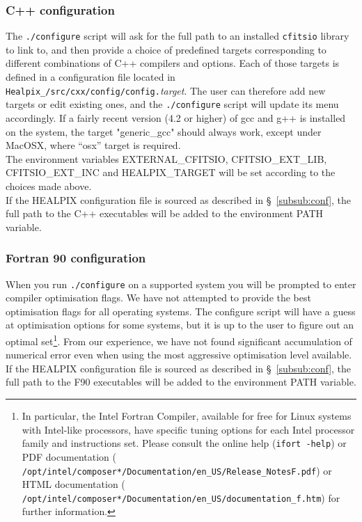 \documentclass[12pt,twoside]{article}
\begin{document}
\subsubsection{C++ configuration}
The {\tt ./configure} script will 
ask for the full path to an installed {\tt cfitsio} library to link to, and then provide a choice of
predefined targets corresponding to different combinations of C++ compilers and
options. Each of those targets is defined in a configuration file located in
{\tt Healpix\_\hpxversion/src/cxx/config/config.}{\em target}.
The user can therefore add new targets or edit existing ones, and the
{\tt ./configure} script will update its menu accordingly.
If a fairly recent version
(4.2 or higher) of gcc and g++ is installed on the system, the target
"generic\_gcc" should always work, except under MacOSX, where ``osx'' target is
required.  \\
The environment variables EXTERNAL\_CFITSIO, 
CFITSIO\_EXT\_LIB, 
CFITSIO\_EXT\_INC and 
HEALPIX\_TARGET 
will be set according to the choices made above.
\\
If the HEALPIX configuration file is sourced as described in \S~\ref{subsub:conf}, the full path to the C++
executables will be added to the environment PATH variable.


\subsubsection{Fortran 90 configuration}
When you run {\tt ./configure} on a supported system 
you will be prompted to enter compiler optimisation flags.
We have not attempted to provide the best optimisation flags for all
operating systems. The configure
script will have a guess at optimisation options for some systems, but it
is up to the user to figure out an optimal set\footnote{In particular, the Intel Fortran
Compiler, available for free for Linux systems with Intel-like processors, have
specific tuning options for each Intel processor family and instructions set. Please consult
the online help ({\tt ifort -help}) or PDF documentation ({\tt
/opt/intel/composer*/Documentation/en\_US/Release\_NotesF.pdf}) or HTML documentation
({\tt 
/opt/intel/composer*/Documentation/en\_US/documentation\_f.htm}) for further
information.}. 
From our experience,
we have not found significant accumulation of numerical error even
when using the most aggressive optimisation level available. \\
If the HEALPIX configuration file is sourced as described in \S~\ref{subsub:conf}, the full path to the F90
executables will be added to the environment PATH variable.
\end{document}
